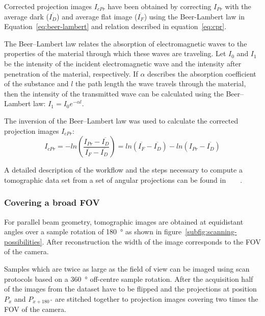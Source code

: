 Corrected projection images $I_{cPr}$ have been obtained by correcting $I_{Pr}$ with the average dark ($\overline{I_{D}}$) and average flat image ($\overline{I_{F}}$) using the Beer-Lambert law in Equation~\ref{eq:beer-lambert} and relation described in equation~\ref{eq:cpr}.

The Beer--Lambert law relates the absorption of electromagnetic waves to the properties of the material through which these waves are traveling. Let $I_{0}$ and $I_{1}$ be the intensity of the incident electromagnetic wave and the intensity after penetration of the material, respectively. If $\alpha$ describes the absorption coefficient of the substance and $l$ the path length the wave travels through the material, then the intensity of the transmitted wave can be calculated using the Beer--Lambert law: \(I_{1}=I_{0}e^{-\alpha l}\label{eq:beer-lambert}\).

The inversion of the Beer--Lambert law was used to calculate the corrected projection images $I_{cPr}$:
\begin{equation}
	I_{cPr} = -ln\left(\frac{I_{Pr}-\overline{I_{D}}}{\overline{I_{F}}-\overline{I_{D}}}\right)
	= ln(\overline{I_{F}}-\overline{I_{D}})-ln(I_{Pr}-\overline{I_{D}})
	\label{eq:cpr}
\end{equation}

A detailed description of the workflow and the steps necessary to compute a tomographic data set from a set of angular projections can be found in%
\ifhtml
	~\citet{Hintermueller2009}
\else
	~
\fi%
.

\subsubsection{Covering a broad FOV}%
\label{subsec:covering a broad fov}%
For parallel beam geometry, tomographic images are obtained at equidistant angles over a sample rotation of \SI{180}{\degree} as shown in figure~\ref{subfig:scanning-possibilities}. After reconstruction the width of the image corresponds to the FOV of the camera.

Samples which are twice as large as the field of view can be imaged using scan protocols based on a \SI{360}{\degree} off-centre sample rotation. After the acquisition half of the images from the dataset have to be flipped and the projections at position $P_{x}$ and $P_{x+\SI{180}{\degree}}$ are stitched together to projection images covering two times the FOV of the camera.

